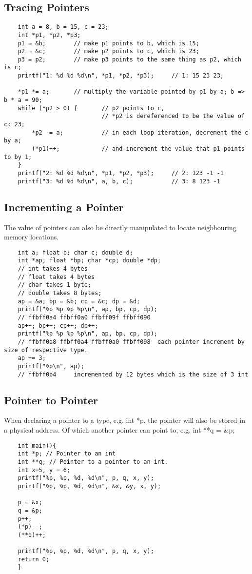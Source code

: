 \documentclass[12pt]{article} %
\begin{document}
\subsection{Tracing Pointers}
\begin{lstlisting}
    int a = 8, b = 15, c = 23;
    int *p1, *p2, *p3;
    p1 = &b;        // make p1 points to b, which is 15;
    p2 = &c;        // make p2 points to c, which is 23;
    p3 = p2;        // make p3 points to the same thing as p2, which is c;
    printf("1: %d %d %d\n", *p1, *p2, *p3);     // 1: 15 23 23;
    
    *p1 *= a;       // multiply the variable pointed by p1 by a; b => b * a = 90;
    while (*p2 > 0) {       // p2 points to c, 
                            // *p2 is dereferenced to be the value of c: 23;
        *p2 -= a;           // in each loop iteration, decrement the c by a;
        (*p1)++;            // and increment the value that p1 points to by 1;
    }
    printf("2: %d %d %d\n", *p1, *p2, *p3);     // 2: 123 -1 -1
    printf("3: %d %d %d\n", a, b, c);           // 3: 8 123 -1

\end{lstlisting}
\subsection{Incrementing a Pointer}
The value of pointers can also be directly manipulated to locate neigbhouring memory locations.
\begin{lstlisting}
    int a; float b; char c; double d;
    int *ap; float *bp; char *cp; double *dp;
    // int takes 4 bytes
    // float takes 4 bytes
    // char takes 1 byte;
    // double takes 8 bytes;
    ap = &a; bp = &b; cp = &c; dp = &d;
    printf("%p %p %p %p\n", ap, bp, cp, dp); 
    // ffbff0a4 ffbff0a0 ffbff09f ffbff090
    ap++; bp++; cp++; dp++;
    printf("%p %p %p %p\n", ap, bp, cp, dp);
    // ffbff0a8 ffbff0a4 ffbff0a0 ffbff098  each pointer increment by size of respective type.
    ap += 3;
    printf("%p\n", ap);
    // ffbff0b4     incremented by 12 bytes which is the size of 3 int
\end{lstlisting}
\subsection{Pointer to Pointer}
When declaring a pointer to a type, e.g. int *p, the pointer will also be stored in a physical address. Of which another pointer can point to, e.g. int **q = \&p;
\begin{lstlisting}
    int main(){
    int *p; // Pointer to an int
    int **q; // Pointer to a pointer to an int.
    int x=5, y = 6;
    printf("%p, %p, %d, %d\n", p, q, x, y);     
    printf("%p, %p, %d, %d\n", &x, &y, x, y);
    
    p = &x;
    q = &p;
    p++;
    (*p)--;  
    (**q)++;   

    printf("%p, %p, %d, %d\n", p, q, x, y);
    return 0;
    }
\end{lstlisting}
\end{document}
